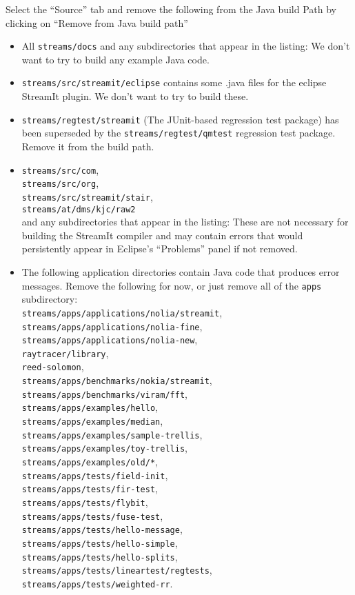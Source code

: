 \documentclass[11pt]{article}
\begin{document}
Select the ``Source'' tab and remove the following from the Java build
Path by clicking on ``Remove from Java build path''
\begin{itemize}
\item All {\tt streams/docs} and any subdirectories that appear in the listing:
 We don't want to try to build any example Java code.
\item {\tt streams/src/streamit/eclipse} contains some .java files for the
eclipse StreamIt plugin.
We don't want to try to build these. 
\item {\tt streams/regtest/streamit} (The JUnit-based regression test
  package) has been superseded by the {\tt streams/regtest/qmtest}
  regression test package.  Remove it from the build path.
\item {\tt streams/src/com},\\
 {\tt streams/src/org},\\ 
 {\tt streams/src/streamit/stair},\\
 {\tt streams/at/dms/kjc/raw2}\\
 and any subdirectories that appear in the listing:
 These are not necessary for building the StreamIt compiler and may contain
 errors that would persistently appear in Eclipse's ``Problems'' panel
 if not removed. 
\item The following application directories contain Java code that
  produces error messages. Remove the following for now, or just remove all of
  the {\tt apps} subdirectory:\\
  {\tt streams/apps/applications/nolia/streamit},\\
  {\tt streams/apps/applications/nolia-fine},\\
  {\tt  streams/apps/applications/nolia-new},\\ 
  {\tt raytracer/library},\\
  {\tt reed-solomon},\\
  {\tt streams/apps/benchmarks/nokia/streamit},\\
  {\tt streams/apps/benchmarks/viram/fft},\\
  {\tt streams/apps/examples/hello},\\
  {\tt streams/apps/examples/median},\\
  {\tt streams/apps/examples/sample-trellis},\\
  {\tt streams/apps/examples/toy-trellis},\\
  {\tt streams/apps/examples/old/*},\\
  {\tt streams/apps/tests/field-init},\\
  {\tt streams/apps/tests/fir-test},\\
  {\tt streams/apps/tests/flybit},\\
  {\tt streams/apps/tests/fuse-test},\\
  {\tt streams/apps/tests/hello-message},\\
  {\tt streams/apps/tests/hello-simple},\\
  {\tt streams/apps/tests/hello-splits},\\
  {\tt streams/apps/tests/lineartest/regtests},\\
  {\tt streams/apps/tests/weighted-rr}.
\end{itemize}
\end{document}
